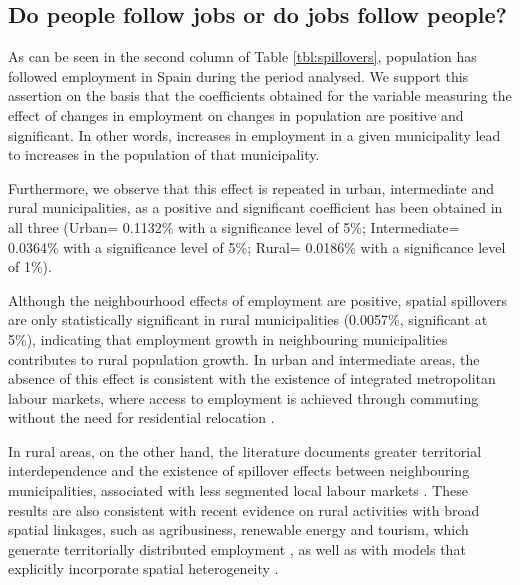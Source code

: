 \documentclass[a4paper,11pt,oneside]{article}
\begin{document}
\subsection{Do people follow jobs or do jobs follow people?}
\label{sec:people_follow_jobs}



As can be seen in the second column of Table \ref{tbl:spillovers}, population has followed employment in Spain during the period analysed. We support this assertion on the basis that the coefficients obtained for the variable measuring the effect of changes in employment on changes in population are positive and significant. In other words, increases in employment in a given municipality lead to increases in the population of that municipality.




Furthermore, we observe that this effect is repeated in urban, intermediate and rural municipalities, as a positive and significant coefficient has been obtained in all three (Urban= 0.1132\% with a significance level of 5\%; Intermediate= 0.0364\% with a significance level of 5\%; Rural= 0.0186\% with a significance level of 1\%).

{\color{black}

Although the neighbourhood effects of employment are positive, spatial spillovers are only statistically significant in rural municipalities (0.0057\%, significant at 5\%), indicating that employment growth in neighbouring municipalities contributes to rural population growth. In urban and intermediate areas, the absence of this effect is consistent with the existence of integrated metropolitan labour markets, where access to employment is achieved through commuting without the need for residential relocation \citep{boarnet1994empirical}.



In rural areas, on the other hand, the literature documents greater territorial interdependence and the existence of spillover effects between neighbouring municipalities, associated with less segmented local labour markets \citep{henry1997hinterland,feser2006harnessing}. These results are also consistent with recent evidence on rural activities with broad spatial linkages, such as agribusiness, renewable energy and tourism, which generate territorially distributed employment \citep[see, for instance,][]{bassil2023economic}, as well as with models that explicitly incorporate spatial heterogeneity \citep{alama2021drivers,alama2024urban}.



}
\end{document}
